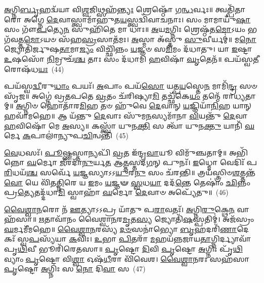 \-\ul{𑌅}\-𑌗𑍍𑌨𑌿\-\ul{𑌰𑍍𑌬𑍃}\-𑌹𑌦𑍍𑌵᳴𑌯𑌾 𑌵𑌿\-\ul{𑌶𑍍𑌵}\-𑌜𑌿𑌥𑍍𑌸𑌹᳴\-\ul{𑌨𑍍𑌤𑍍𑌯𑌃} 𑌶𑍍𑌰𑍇𑌷𑍍𑌠𑍋᳴ 𑌗\-\ul{𑌨𑍍𑌧}\-𑌰𑍍𑌵𑌃॥ 𑌤𑍍𑌵𑌤𑍍𑌪𑌿᳴𑌤𑌾𑌰𑍋 𑌅𑌗𑍍𑌨𑍇 \ul{𑌦𑍇}\-𑌵𑌾𑌸𑍍𑌤𑍍𑌵𑌾𑌮𑌾᳴𑌹𑍁𑌤\-\ul{𑌯}\-𑌸𑍍𑌤𑍍𑌵𑌦𑍍𑌵𑌿᳴𑌵𑌾𑌚𑌨𑌾𑌃। 𑌸𑌂 𑌮𑌾𑌮𑌾𑌯𑍁᳴\-\ul{𑌷𑌾} 𑌸𑌂 𑌗𑍗᳴\-\ul{𑌪}\-𑌤𑍍𑌯𑍇\-\ul{𑌨} 𑌸𑍁𑌹𑌿᳴𑌤𑍇 𑌮𑌾 𑌧𑌾𑌃॥ \ul{𑌅}\-𑌯\-\ul{𑌮}\-𑌗𑍍𑌨𑌿𑌃 𑌶𑍍𑌰𑍇𑌷𑍍𑌠᳴𑌤\-\ul{𑌮𑍋}\-\-𑌽𑌯𑌂 𑌭𑌗᳴𑌵𑌤𑍍𑌤\-\ul{𑌮𑍋}\-\-𑌽𑌯𑍞 𑌸᳴𑌹\-\ul{𑌸𑍍𑌰}\-𑌸𑌾𑌤᳴𑌮𑌃। \ul{𑌅}\-𑌸𑍍𑌮𑌾 𑌅᳴𑌸𑍍𑌤𑍁 \ul{𑌸𑍁}\-𑌵𑍀𑌰𑍍𑌯𑌮𑍍॑॥ 𑌮\-\ul{𑌨𑍋} 𑌜𑍍𑌯𑍋𑌤𑌿᳴𑌰𑍍𑌜𑍁𑌷\-\ul{𑌤𑌾}\-𑌮𑌾\-\ul{𑌜𑍍𑌯𑌂} 𑌵𑌿𑌚𑍍𑌛𑌿᳴𑌨𑍍𑌨𑌂 \ul{𑌯}\-𑌜𑍍𑌞𑍞 𑌸\-\ul{𑌮𑌿}\-𑌮𑌂 𑌦᳴𑌧𑌾𑌤𑍁। 𑌯𑌾 \ul{𑌇}\-𑌷𑍍𑌟𑌾 \ul{𑌉}\-𑌷𑌸𑍋᳴ \ul{𑌨𑌿}\-𑌮𑍍𑌰𑍁𑌚᳴\-\ul{𑌶𑍍𑌚} 𑌤𑌾𑌃 𑌸𑌂 𑌦᳴𑌧𑌾𑌮𑌿 \ul{𑌹}\-𑌵𑌿𑌷𑌾᳴ \ul{𑌘𑍃}\-𑌤𑍇𑌨᳴॥ 𑌪𑌯᳴𑌸𑍍𑌵\-\ul{𑌤𑍀}\-𑌰𑍋𑌷᳴𑌧\-\ul{𑌯𑌃}\-~(44)

𑌪𑌯᳴𑌸𑍍𑌵\-\ul{𑌦𑍍𑌵𑍀}\-𑌰𑍁\-\ul{𑌧𑌾𑌂} 𑌪𑌯𑌃᳴। \ul{𑌅}\-𑌪𑌾𑌂 𑌪𑌯᳴\-\ul{𑌸𑍋} 𑌯𑌤𑍍𑌪\-\ul{𑌯}\-𑌸𑍍𑌤𑍇\-\ul{𑌨} 𑌮𑌾𑌮𑌿᳴\-\ul{𑌨𑍍𑌦𑍍𑌰} 𑌸𑍞 𑌸𑍃᳴𑌜॥ 𑌅𑌗𑍍𑌨𑍇॑ 𑌵𑍍𑌰𑌤𑌪𑌤𑍇 \ul{𑌵𑍍𑌰}\-𑌤𑌂 𑌚᳴𑌰𑌿𑌷𑍍𑌯𑌾\-\ul{𑌮𑌿} 𑌤𑌚𑍍𑌛᳴𑌕𑍇\-\ul{𑌯𑌂} 𑌤𑌨𑍍𑌮𑍇᳴ 𑌰𑌾𑌧𑍍𑌯𑌤𑌾𑌮𑍍॥ \ul{𑌅}\-𑌗𑍍𑌨𑌿𑍞 𑌹𑍋𑌤𑌾᳴𑌰\-\ul{𑌮𑌿}\-𑌹 𑌤𑍞 𑌹𑍁᳴𑌵𑍇 \ul{𑌦𑍇}\-𑌵𑌾𑌨𑍍 \ul{𑌯}\-𑌜𑍍𑌞𑌿𑌯𑌾᳴\-\ul{𑌨𑌿}\-𑌹 𑌯𑌾𑌨𑍍 𑌹𑌵𑌾᳴𑌮𑌹𑍇॥ 𑌆 𑌯᳴𑌨𑍍𑌤𑍁 \ul{𑌦𑍇}\-𑌵𑌾𑌃 𑌸𑍁᳴𑌮\-\ul{𑌨}\-𑌸𑍍𑌯𑌮𑌾᳴𑌨𑌾 \ul{𑌵𑌿}\-𑌯𑌨𑍍𑌤𑍁᳴ \ul{𑌦𑍇}\-𑌵𑌾 \ul{𑌹}\-𑌵𑌿𑌷𑍋᳴ 𑌮𑍇 \ul{𑌅}\-𑌸𑍍𑌯॥ 𑌕𑌸𑍍𑌤𑍍𑌵𑌾᳴ 𑌯𑍁𑌨\-\ul{𑌕𑍍𑌤𑌿} 𑌸 𑌤𑍍𑌵𑌾᳴ 𑌯𑍁𑌨\-\ul{𑌕𑍍𑌤𑍁} 𑌯𑌾𑌨𑌿᳴ \ul{𑌘}\-𑌰𑍍𑌮𑍇 \ul{𑌕}\-𑌪𑌾𑌲𑌾॑𑌨𑍍𑌯𑍁𑌪\-\ul{𑌚𑌿}\-𑌨𑍍𑌵𑌨𑍍𑌤𑌿᳴~(45)

\-\ul{𑌵𑍇}\-𑌧𑌸𑌃᳴। \ul{𑌪𑍂}\-𑌷𑍍𑌣𑌸𑍍𑌤𑌾𑌨𑍍𑌯𑌪𑌿᳴ \ul{𑌵𑍍𑌰}\-𑌤 𑌇᳴𑌨𑍍𑌦𑍍𑌰\-\ul{𑌵𑌾}\-𑌯𑍂 𑌵𑌿𑌮𑍁᳴𑌞𑍍𑌚𑌤𑌾𑌮𑍍॥ 𑌅𑌭𑌿᳴𑌨𑍍𑌨𑍋 \ul{𑌘}\-𑌰𑍍𑌮𑍋 \ul{𑌜𑍀}\-𑌰𑌦𑌾᳴\-\ul{𑌨𑍁}\-𑌰𑍍𑌯\-\ul{𑌤} 𑌆\-\ul{𑌤𑍍𑌤}\-𑌸𑍍𑌤𑌦᳴\-\ul{𑌗}\-𑌨𑍍 𑌪𑍁𑌨𑌃᳴। \ul{𑌇}\-𑌧𑍍𑌮𑍋 𑌵𑍇𑌦𑌿𑌃᳴ 𑌪\-\ul{𑌰𑌿}\-𑌧𑌯᳴\-\ul{𑌶𑍍𑌚} 𑌸𑌰𑍍𑌵𑍇᳴ \ul{𑌯}\-𑌜𑍍𑌞𑌸𑍍𑌯𑌾\-𑌽\-𑌽\-\ul{𑌯𑍁}\-𑌰\-\ul{𑌨𑍁} 𑌸𑌂 𑌚᳴𑌰𑌨𑍍𑌤𑌿॥ 𑌤𑍍𑌰𑌯᳴𑌸𑍍𑌤𑍍𑌰𑌿𑍞\-\ul{𑌶}\-𑌤𑍍𑌤𑌨𑍍𑌤᳴\-\ul{𑌵𑍋} 𑌯𑍇 𑌵𑌿᳴𑌤\-\ul{𑌤𑍍𑌨𑌿}\-𑌰𑍇 𑌯 \ul{𑌇}\-𑌮𑌂 \ul{𑌯}\-𑌜𑍍𑌞𑍟 \ul{𑌸𑍍𑌵}\-𑌧\-\ul{𑌯𑌾} 𑌦𑌦᳴\-\ul{𑌨𑍍𑌤𑍇} 𑌤𑍇𑌷𑌾𑌂॑ \ul{𑌛𑌿}\-𑌨𑍍𑌨𑌂 𑌪𑍍𑌰\-\ul{𑌤𑍍𑌯𑍇}\-𑌤𑌦𑍍𑌦᳴𑌧𑌾\-\ul{𑌮𑌿} 𑌸𑍍𑌵𑌾𑌹𑌾᳴ \ul{𑌘}\-𑌰𑍍𑌮𑍋 \ul{𑌦𑍇}\-𑌵𑌾𑍞 𑌅𑌪𑍍𑌯𑍇᳴𑌤𑍁॥~(46)

{\anuvakamend[{𑌅𑌷𑌾᳴\-\ul{𑌢} 𑌓𑌷᳴𑌧𑌯 𑌉𑌪\-\ul{𑌚𑌿}\-𑌨𑍍𑌵\-\ul{𑌨𑍍𑌤𑌿} 𑌪𑌞𑍍𑌚᳴𑌚𑌤𑍍𑌵𑌾𑌰𑌿𑍞𑌶𑌚𑍍𑌚}]}%

\-\ul{𑌵𑍈}\-\-\ul{𑌶𑍍𑌵𑌾}\-\-\ul{𑌨}\-𑌰𑍋 𑌨᳴ \ul{𑌊}\-𑌤𑍍𑌯𑌾\-𑌽\-𑌽𑌪𑍍𑌰 𑌯𑌾᳴𑌤𑍁 𑌪\-\ul{𑌰𑌾}\-𑌵𑌤𑌃᳴। \ul{𑌅}\-𑌗𑍍𑌨𑌿\-\ul{𑌰𑍁}\-𑌕𑍍𑌥𑍇\-\ul{𑌨} 𑌵𑌾𑌹᳴𑌸𑌾॥ \ul{𑌋}\-𑌤𑌾𑌵𑌾᳴𑌨𑌂 𑌵𑍈𑌶𑍍𑌵𑌾\-\ul{𑌨}\-𑌰\-\ul{𑌮𑍃}\-𑌤\-\ul{𑌸𑍍𑌯} 𑌜𑍍𑌯𑍋𑌤𑌿᳴\-\ul{𑌷}\-𑌸𑍍𑌪𑌤𑌿𑌮𑍍॑। 𑌅𑌜᳴𑌸𑍍𑌰𑌂 \ul{𑌘}\-𑌰𑍍𑌮𑌮𑍀᳴𑌮𑌹𑍇॥ \ul{𑌵𑍈}\-\-\ul{𑌶𑍍𑌵𑌾}\-\-\ul{𑌨}\-𑌰𑌸𑍍𑌯᳴ \ul{𑌦}\-\-\ul{𑍞}\-𑌸𑌨𑌾॑𑌭𑍍𑌯𑍋 \ul{𑌬𑍃}\-𑌹𑌦𑌰𑌿᳴\-\ul{𑌣𑌾}\-𑌦𑍇𑌕𑌃᳴ 𑌸𑍍𑌵\-\ul{𑌪}\-𑌸𑍍𑌯᳴𑌯𑌾 \ul{𑌕}\-𑌵𑌿𑌃। \ul{𑌉}\-𑌭𑌾 \ul{𑌪𑌿}\-𑌤𑌰𑌾᳴ \ul{𑌮}\-𑌹𑌯᳴𑌨𑍍𑌨𑌜𑌾𑌯\-\ul{𑌤𑌾}\-𑌗𑍍𑌨𑌿𑌰𑍍𑌦𑍍𑌯𑌾𑌵𑌾᳴𑌪𑍃\-\ul{𑌥𑌿}\-𑌵𑍀 𑌭𑍂𑌰𑌿᳴𑌰𑍇𑌤𑌸𑌾॥ \ul{𑌪𑍃}\-𑌷𑍍𑌟𑍋 \ul{𑌦𑌿}\-𑌵𑌿 \ul{𑌪𑍃}\-𑌷𑍍𑌟𑍋 \ul{𑌅}\-𑌗𑍍𑌨𑌿𑌃 𑌪𑍃᳴\-\ul{𑌥𑌿}\-𑌵𑍍𑌯𑌾𑌂 \ul{𑌪𑍃}\-𑌷𑍍𑌟𑍋 𑌵𑌿\-\ul{𑌶𑍍𑌵𑌾} 𑌓𑌷᳴\-\ul{𑌧𑍀}\-𑌰𑌾 𑌵𑌿᳴𑌵𑍇𑌶। \ul{𑌵𑍈}\-\-\ul{𑌶𑍍𑌵𑌾}\-\-\ul{𑌨}\-𑌰𑌃 𑌸𑌹᳴𑌸𑌾 \ul{𑌪𑍃}\-𑌷𑍍𑌟𑍋 \ul{𑌅}\-𑌗𑍍𑌨𑌿𑌃 𑌸 \ul{𑌨𑍋} 𑌦𑌿\-\ul{𑌵𑌾} 𑌸~(47)

